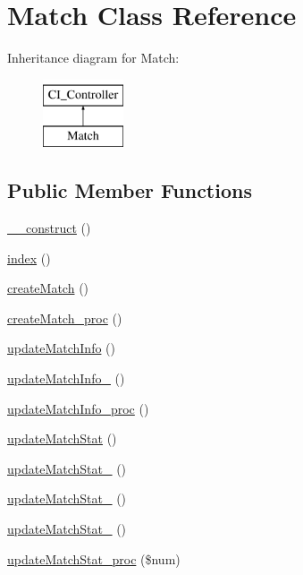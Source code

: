 \hypertarget{class_match}{}\section{Match Class Reference}
\label{class_match}
Inheritance diagram for Match\+:\begin{figure}[H]
\begin{center}
\leavevmode
\includegraphics[height=2.000000cm]{class_match}
\end{center}
\end{figure}
\subsection*{Public Member Functions}
\begin{DoxyCompactItemize}
\item 
\hyperlink{class_match_a095c5d389db211932136b53f25f39685}{\+\_\+\+\_\+construct} ()
\item 
\hyperlink{class_match_a149eb92716c1084a935e04a8d95f7347}{index} ()
\item 
\hyperlink{class_match_a42cb5a57a0992197a94223b997fce109}{create\+Match} ()
\item 
\hyperlink{class_match_a30767649a1516e740956170d36272d35}{create\+Match\+\_\+proc} ()
\item 
\hyperlink{class_match_a68dd0420f1e7733c8e8b352519486662}{update\+Match\+Info} ()
\item 
\hyperlink{class_match_a18ae482a35f49cfebf37699a9fab6ea7}{update\+Match\+Info\+\_} ()
\item 
\hyperlink{class_match_ad00815d97139bb53c7783dd490bf7ac3}{update\+Match\+Info\+\_\+proc} ()
\item 
\hyperlink{class_match_a1eeda753a835c23339d41ca90cee545b}{update\+Match\+Stat} ()
\item 
\hyperlink{class_match_a503ffbee4d88f365e310bc85f14ae05f}{update\+Match\+Stat\+\_} ()
\item 
\hyperlink{class_match_a47f6573f69a86fff924ed273af40f64d}{update\+Match\+Stat\+\_} ()
\item 
\hyperlink{class_match_a2b1652e7969d187301a541b6ab81f8bf}{update\+Match\+Stat\+\_} ()
\item 
\hyperlink{class_match_a7ddc22f499706fcc4cdec8ad4265d8a4}{update\+Match\+Stat\+\_\+proc} (\$num)
\end{DoxyCompactItemize}
